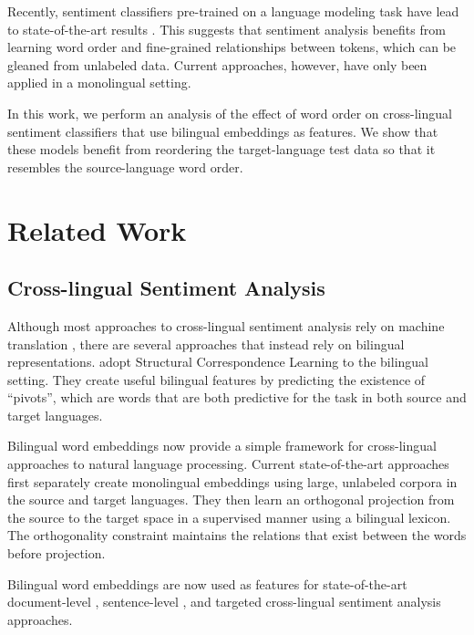 \documentclass[11pt,a4paper]{article}
\begin{document}
Recently, sentiment classifiers pre-trained on a language modeling task have lead to state-of-the-art results \cite{Peters2018,Howard2018,Devlin2018}. This suggests that sentiment analysis benefits from learning word order and fine-grained relationships between tokens, which can be gleaned from unlabeled data. Current approaches, however, have only been applied in a monolingual setting. 

In this work, we perform an analysis of the effect of word order on cross-lingual sentiment classifiers that use bilingual embeddings as features. We show that these models benefit from reordering the target-language test data so that it resembles the source-language word order.


\section{Related Work}

\subsection{Cross-lingual Sentiment Analysis}

Although most approaches to cross-lingual sentiment analysis rely on machine translation \cite{Banea2008,Balahur2014d,Klinger2015},
there are several approaches that instead rely on bilingual representations. 
 adopt Structural Correspondence Learning to the
bilingual setting. They create useful bilingual features by predicting the existence
of ``pivots'', which are words that are both predictive for the task in both source and target languages.

Bilingual word embeddings \cite{Kocisky2014,Chandar2014,Luong2015} now provide
a simple framework for cross-lingual approaches to natural language processing. 
Current state-of-the-art approaches \cite{Artetxe2017,Artetxe2018,Lample2017} first separately create monolingual embeddings using large, unlabeled corpora in the source and target languages. They then learn an orthogonal projection from the source to the target space in a supervised manner using a bilingual lexicon. The orthogonality constraint maintains the relations that exist between the words before projection.

Bilingual word embeddings are now used as features for state-of-the-art document-level \cite{Chen2016}, sentence-level \cite{Barnes2018b}, and targeted \cite{Hangya2018} cross-lingual sentiment analysis approaches.
\end{document}
